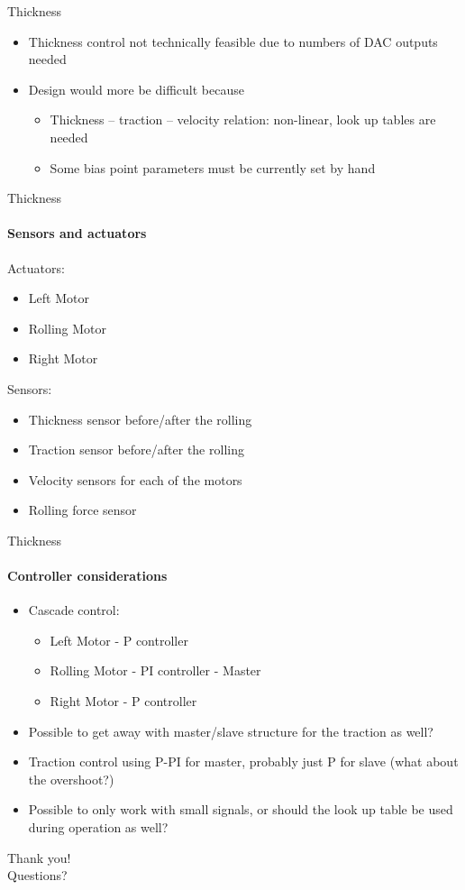 
\begin{frame}{Thickness}
	\begin{itemize}
		\item Thickness control not technically feasible due to numbers of DAC outputs needed
		\item Design would more be difficult because
		\begin{itemize}
			\item Thickness -- traction -- velocity relation: non-linear, look up tables are needed
			\item Some bias point parameters must be currently set by hand
		\end{itemize}
\end{itemize}
\end{frame}

\begin{frame}{Thickness}
\framesubtitle{Sensors and actuators}
Actuators:
\begin{itemize}
	\item Left Motor
	\item Rolling Motor
	\item Right Motor
\end{itemize}
Sensors:
\begin{itemize}
\item Thickness sensor before/after the rolling
\item Traction sensor before/after the rolling
\item Velocity sensors for each of the motors
\item Rolling force sensor
\end{itemize}
\end{frame}

\begin{frame}{Thickness}
\framesubtitle{Controller considerations}
\begin{itemize}
\item Cascade control:
\begin{itemize}
	\item Left Motor - P controller
	\item Rolling Motor - PI controller - Master
	\item Right Motor - P controller
\end{itemize}
\item Possible to get away with master/slave structure for the traction as well?
\item Traction control using P-PI for master, probably just P for slave (what about the overshoot?)
\item Possible to only work with small signals, or should the look up table be used during operation as well?
\end{itemize}
\end{frame}

\begin{frame}
\begin{center}
\Huge Thank you!\\
Questions?
\end{center}
\end{frame}
